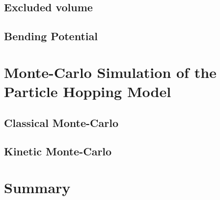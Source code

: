 \subsection{Excluded volume}
\label{sub:excluded_volume}

\subsection{Bending Potential}
\label{sub:bending_potential}


\section{Monte-Carlo Simulation of the Particle Hopping Model}
\label{sec:monte_carlo_simulation_of_the_particle_hopping_model}

\subsection{Classical Monte-Carlo}
\label{sub:classical_monte_carlo}

\subsection{Kinetic Monte-Carlo}
\label{sub:kinetic_monte_carlo}


\section{Summary}
\label{sec:summary}


